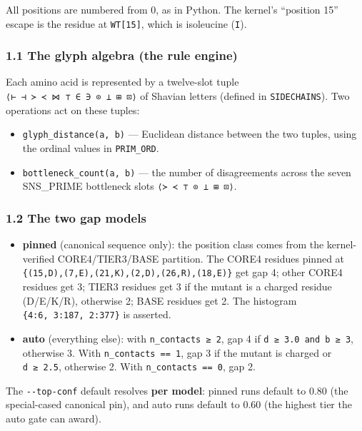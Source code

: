 All positions are numbered from 0, as in Python. The kernel's ``position
15'' escape is the residue at \texttt{WT{[}15{]}}, which is isoleucine
(\texttt{\textquotesingle{}I\textquotesingle{}}).

\hypertarget{the-glyph-algebra-the-rule-engine}{%
\subsubsection{1.1 The glyph algebra (the rule
engine)}\label{the-glyph-algebra-the-rule-engine}}

Each amino acid is represented by a twelve-slot tuple
\texttt{⟨⊢\ ⊣\ ≻\ ≺\ ⋈\ ⊤\ ∈\ ∋\ ⊙\ ⊥\ ⊞\ ⊡⟩} of Shavian letters
(defined in \texttt{SIDECHAINS}). Two operations act on these tuples:

\begin{itemize}
\tightlist
\item
  \texttt{glyph\_distance(a,\ b)} --- Euclidean distance between the two
  tuples, using the ordinal values in \texttt{PRIM\_ORD}.
\item
  \texttt{bottleneck\_count(a,\ b)} --- the number of disagreements
  across the seven SNS\_PRIME bottleneck slots
  \texttt{⟨≻\ ≺\ ⊤\ ⊙\ ⊥\ ⊞\ ⊡⟩}.
\end{itemize}

\hypertarget{the-two-gap-models}{%
\subsubsection{1.2 The two gap models}\label{the-two-gap-models}}

\begin{itemize}
\tightlist
\item
  \textbf{pinned} (canonical sequence only): the position class comes
  from the kernel-verified CORE4/TIER3/BASE partition. The CORE4
  residues pinned at
  \texttt{\{(15,D),(7,E),(21,K),(2,D),(26,R),(18,E)\}} get gap 4; other
  CORE4 residues get 3; TIER3 residues get 3 if the mutant is a charged
  residue (D/E/K/R), otherwise 2; BASE residues get 2. The histogram
  \texttt{\{4:6,\ 3:187,\ 2:377\}} is asserted.
\item
  \textbf{auto} (everything else): with \texttt{n\_contacts\ ≥\ 2}, gap
  4 if \texttt{d\ ≥\ 3.0\ and\ b\ ≥\ 3}, otherwise 3. With
  \texttt{n\_contacts\ ==\ 1}, gap 3 if the mutant is charged or
  \texttt{d\ ≥\ 2.5}, otherwise 2. With \texttt{n\_contacts\ ==\ 0}, gap
  2.
\end{itemize}

The \texttt{-\/-top-conf} default resolves \textbf{per model}: pinned
runs default to 0.80 (the special-cased canonical pin), and auto runs
default to 0.60 (the highest tier the auto gate can award).

